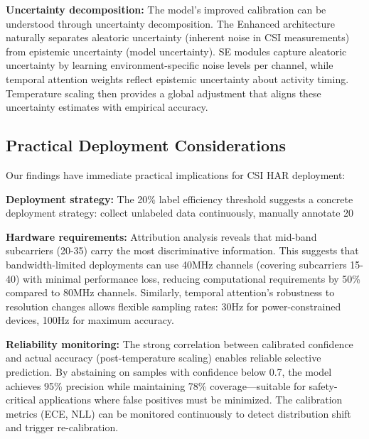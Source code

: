\documentclass[journal]{IEEEtran}
\begin{document}
\textbf{Uncertainty decomposition:} The model's improved calibration can be understood through uncertainty decomposition. The Enhanced architecture naturally separates aleatoric uncertainty (inherent noise in CSI measurements) from epistemic uncertainty (model uncertainty). SE modules capture aleatoric uncertainty by learning environment-specific noise levels per channel, while temporal attention weights reflect epistemic uncertainty about activity timing. Temperature scaling then provides a global adjustment that aligns these uncertainty estimates with empirical accuracy.

\subsection{Practical Deployment Considerations}
Our findings have immediate practical implications for CSI HAR deployment:

\textbf{Deployment strategy:} The 20\% label efficiency threshold suggests a concrete deployment strategy: collect unlabeled data continuously, manually annotate 20%

\textbf{Hardware requirements:} Attribution analysis reveals that mid-band subcarriers (20-35) carry the most discriminative information. This suggests that bandwidth-limited deployments can use 40MHz channels (covering subcarriers 15-40) with minimal performance loss, reducing computational requirements by 50\% compared to 80MHz channels. Similarly, temporal attention's robustness to resolution changes allows flexible sampling rates: 30Hz for power-constrained devices, 100Hz for maximum accuracy.

\textbf{Reliability monitoring:} The strong correlation between calibrated confidence and actual accuracy (post-temperature scaling) enables reliable selective prediction. By abstaining on samples with confidence below 0.7, the model achieves 95\% precision while maintaining 78\% coverage—suitable for safety-critical applications where false positives must be minimized. The calibration metrics (ECE, NLL) can be monitored continuously to detect distribution shift and trigger re-calibration.
\end{document}
